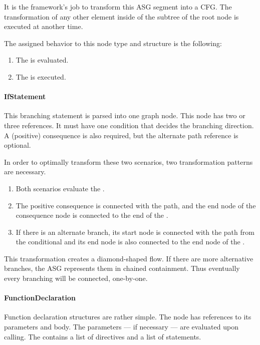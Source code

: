 It is the framework's job to transform this ASG segment into a CFG. The transformation of any other element inside of the subtree of the root  node is executed at another time.

The assigned behavior to this node type and structure is the following:
\begin{enumerate}[topsep=0pt]
	\item The  is evaluated.
	\item The  is executed.
\end{enumerate}


\paragraph{IfStatement}
This branching statement is parsed into one graph node. This node has two or three references. It must have one condition that decides the branching direction. A (positive) consequence is also required, but the alternate path reference is optional.

In order to optimally transform these two scenarios, two transformation patterns are necessary.
\begin{enumerate}[topsep=0pt]
	\item Both scenarios evaluate the .
	\item The positive consequence is connected with the  path, and the end node of the consequence node is connected to the end of the .
	\item If there is an alternate branch, its start node is connected with the  path from the conditional  and its end node is also connected to the end node of the .
\end{enumerate}

This transformation creates a diamond-shaped flow. If there are more alternative branches, the ASG represents them in chained containment. Thus eventually every branching will be connected, one-by-one.

\paragraph{FunctionDeclaration}
Function declaration structures are rather simple. The node has references to its parameters and body. The parameters --- if necessary --- are evaluated upon calling. The  contains a list of directives and a list of statements.

